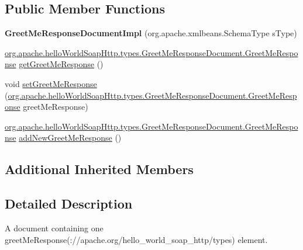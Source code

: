 \subsection*{Public Member Functions}
\begin{DoxyCompactItemize}
\item 
\hypertarget{classorg_1_1apache_1_1hello_world_soap_http_1_1types_1_1impl_1_1_greet_me_response_document_impl_a0862b8bd8a804208e61e03b341c4f503}{}{\bfseries Greet\+Me\+Response\+Document\+Impl} (org.\+apache.\+xmlbeans.\+Schema\+Type s\+Type)\label{classorg_1_1apache_1_1hello_world_soap_http_1_1types_1_1impl_1_1_greet_me_response_document_impl_a0862b8bd8a804208e61e03b341c4f503}

\item 
\hyperlink{interfaceorg_1_1apache_1_1hello_world_soap_http_1_1types_1_1_greet_me_response_document_1_1_greet_me_response}{org.\+apache.\+hello\+World\+Soap\+Http.\+types.\+Greet\+Me\+Response\+Document.\+Greet\+Me\+Response} \hyperlink{classorg_1_1apache_1_1hello_world_soap_http_1_1types_1_1impl_1_1_greet_me_response_document_impl_a4cb92f4d32f545ed9462af9aaba70b43}{get\+Greet\+Me\+Response} ()
\item 
void \hyperlink{classorg_1_1apache_1_1hello_world_soap_http_1_1types_1_1impl_1_1_greet_me_response_document_impl_a174946acd2bc8a143f8e91e25312d4f0}{set\+Greet\+Me\+Response} (\hyperlink{interfaceorg_1_1apache_1_1hello_world_soap_http_1_1types_1_1_greet_me_response_document_1_1_greet_me_response}{org.\+apache.\+hello\+World\+Soap\+Http.\+types.\+Greet\+Me\+Response\+Document.\+Greet\+Me\+Response} greet\+Me\+Response)
\item 
\hyperlink{interfaceorg_1_1apache_1_1hello_world_soap_http_1_1types_1_1_greet_me_response_document_1_1_greet_me_response}{org.\+apache.\+hello\+World\+Soap\+Http.\+types.\+Greet\+Me\+Response\+Document.\+Greet\+Me\+Response} \hyperlink{classorg_1_1apache_1_1hello_world_soap_http_1_1types_1_1impl_1_1_greet_me_response_document_impl_a650ea5a9015d4325f66fa6f578ae2b05}{add\+New\+Greet\+Me\+Response} ()
\end{DoxyCompactItemize}
\subsection*{Additional Inherited Members}


\subsection{Detailed Description}
A document containing one greet\+Me\+Response(\+://apache.org/hello\+\_\+world\+\_\+soap\+\_\+http/types) element.

